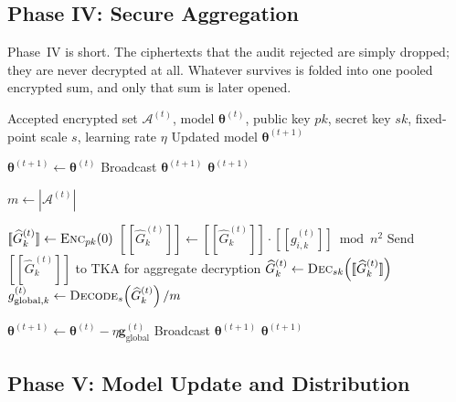 \subsection{Phase IV: Secure Aggregation}
\label{sec:fip-phaseIV}

Phase~IV is short. The ciphertexts that the audit rejected are simply dropped; they are never decrypted at all. Whatever survives is folded into one pooled encrypted sum, and only that sum is later opened.

\clearpage
\begin{algorithm}[H]
\caption{Secure Aggregation and Model Update}
\label{alg:secure_aggregation}
\begin{algorithmic}[1]
\Require Accepted encrypted set $\mathcal{A}^{(t)}$, model $\boldsymbol{\theta}^{(t)}$, public key $pk$, secret key $sk$, fixed-point scale $s$, learning rate $\eta$
\Ensure Updated model $\boldsymbol{\theta}^{(t+1)}$

    \State $\boldsymbol{\theta}^{(t+1)} \gets \boldsymbol{\theta}^{(t)}$
    \State Broadcast $\boldsymbol{\theta}^{(t+1)}$
    \State \Return $\boldsymbol{\theta}^{(t+1)}$
\EndIf

\State $m \gets |\mathcal{A}^{(t)}|$

    \State $[\![\widehat{G}_{k}^{(t)}]\!] \gets \textsc{Enc}_{pk}(0)$
        \State $[\![\widehat{G}_{k}^{(t)}]\!] \gets [\![\widehat{G}_{k}^{(t)}]\!] \cdot [\![g_{i,k}^{(t)}]\!] \bmod n^{2}$
    \EndFor
    \State Send $[\![\widehat{G}_{k}^{(t)}]\!]$ to TKA for aggregate decryption
    \State $\widehat{G}_{k}^{(t)} \gets \textsc{Dec}_{sk}\!\left([\![\widehat{G}_{k}^{(t)}]\!]\right)$
    \State $g_{\text{global},k}^{(t)} \gets \textsc{Decode}_{s}\!\left(\widehat{G}_{k}^{(t)}\right)/m$
\EndFor

\State $\boldsymbol{\theta}^{(t+1)} \gets \boldsymbol{\theta}^{(t)}-\eta\mathbf{g}_{\text{global}}^{(t)}$
\State Broadcast $\boldsymbol{\theta}^{(t+1)}$
\State \Return $\boldsymbol{\theta}^{(t+1)}$
\end{algorithmic}
\end{algorithm}

\subsection{Phase V: Model Update and Distribution}
\label{sec:fip-phaseV}

